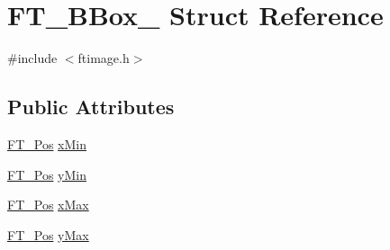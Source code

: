 \hypertarget{struct_f_t___b_box__}{\section{F\-T\-\_\-\-B\-Box\-\_\- Struct Reference}
\label{struct_f_t___b_box__}
}


{\ttfamily \#include $<$ftimage.\-h$>$}

\subsection*{Public Attributes}
\begin{DoxyCompactItemize}
\item 
\hyperlink{ftimage_8h_af5f230f4b253d4c7715fd2e595614c90}{F\-T\-\_\-\-Pos} \hyperlink{struct_f_t___b_box___a1f2a5d0565d496c1d41e43d018f45add}{x\-Min}
\item 
\hyperlink{ftimage_8h_af5f230f4b253d4c7715fd2e595614c90}{F\-T\-\_\-\-Pos} \hyperlink{struct_f_t___b_box___a959ca1d5bc1c5338da0d85c8e7135f4e}{y\-Min}
\item 
\hyperlink{ftimage_8h_af5f230f4b253d4c7715fd2e595614c90}{F\-T\-\_\-\-Pos} \hyperlink{struct_f_t___b_box___ac6da5c44f4cb7b97eef1f438eb69c0ec}{x\-Max}
\item 
\hyperlink{ftimage_8h_af5f230f4b253d4c7715fd2e595614c90}{F\-T\-\_\-\-Pos} \hyperlink{struct_f_t___b_box___a77084921589f386a8a593ae1f25b1569}{y\-Max}
\end{DoxyCompactItemize}


